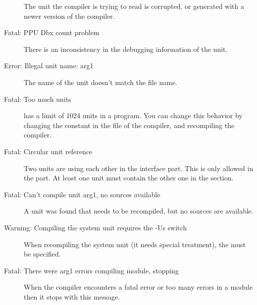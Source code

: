 \begin{description}
 The unit the compiler is trying to read is corrupted, or generated with a
 newer version of the compiler.
\item [Fatal: PPU Dbx count problem]
 There is an inconsistency in the debugging information of the unit.
\item [Error: Illegal unit name: arg1]
 The name of the unit doesn't match the file name.
\item [Fatal: Too much units]
 \fpc has a limit of 1024 units in a program. You can change this behavior
 by changing the  constant in the  file of the
 compiler, and recompiling the compiler. 
\item [Fatal: Circular unit reference]
 Two units are using each other in the interface part. This is only allowed
 in the  part. At least one unit must contain the other one
 in the  section.
\item [Fatal: Can't compile unit arg1, no sources available]
 A unit was found that needs to be recompiled, but no sources are
 available.
\item [Warning: Compiling the system unit requires the -Us switch]
 When recompiling the system unit (it needs special treatment), the 
  must be specified.
\item [Fatal: There were arg1 errors compiling module, stopping]
 When the compiler encounters a fatal error or too many errors in a module
 then it stops with this message.
 \end{description}
